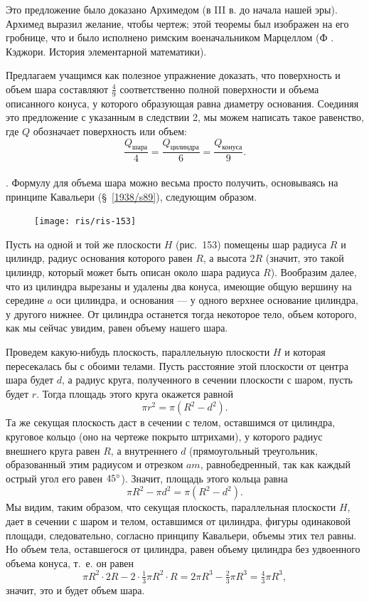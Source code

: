 \documentclass[twoside]{book}
\begin{document}
Это предложение было доказано Архимедом (в III в. до начала нашей эры).
Архимед выразил желание, чтобы чертеж;
этой теоремы был изображен на его гробнице, что и было исполнено римским военачальником Марцеллом (Ф . Кэджори.
История элементарной математики).

Предлагаем учащимся как полезное упражнение доказать, что поверхность и объем шара составляют $\tfrac49$ соответственно полной поверхности и объема описанного конуса, у которого образующая равна диаметру основания.
Соединяя это предложение с указанным в следствии 2, мы можем написать такое равенство, где $Q$ обозначает поверхность или объем:
\[\frac{Q_{\text{шара}}}4
=\frac{Q_{\text{цилиндра}}}6
=\frac{Q_{\text{конуса}}}9.
\]

\paragraph{}\label{1938/s147}
.
Формулу для объема шара можно весьма просто получить, основываясь на принципе Кавальери (§~\ref{1938/s89}), следующим образом.

\begin{figure}[h!]
\centering
\texttt{[image: ris/ris-153]}
\caption{}
\end{figure}

Пусть на одной и той же плоскости $H$ (рис.~153) помещены шар радиуса $R$ и цилиндр, радиус основания которого равен $R$, а высота $2R$ (значит, это такой цилиндр, который может быть описан около шара радиуса $R$).
Вообразим далее, что из цилиндра вырезаны и удалены два конуса, имеющие общую вершину на середине $a$ оси цилиндра, и основания --- у одного верхнее основание цилиндра, у другого нижнее.
От цилиндра останется тогда некоторое тело, объем которого, как мы сейчас увидим, равен объему нашего шара.

Проведем какую-нибудь плоскость, параллельную плоскости $H$ и которая пересекалась бы с обоими телами.
Пусть расстояние этой плоскости от центра шара будет $d$, а радиус круга, полученного в сечении плоскости с шаром, пусть будет $r$.
Тогда площадь этого круга окажется равной 
\[\pi r^2 = \pi (R^2 - d^2).\]
Та же секущая плоскость даст в сечении с телом, оставшимся от цилиндра, круговое кольцо (оно на чертеже покрыто штрихами), у которого радиус внешнего круга равен $R$, а внутреннего $d$ (прямоугольный треугольник, образованный этим радиусом и отрезком $am$, равнобедренный, так как каждый острый угол его равен $45\degree$).
Значит, площадь этого кольца равна 
\[\pi R^2 - \pi d^2 = \pi(R^2 - d^2).\]
Мы видим, таким образом, что секущая плоскость, параллельная плоскости $H$, дает в сечении с шаром и телом, оставшимся от цилиндра, фигуры одинаковой площади, следовательно, согласно принципу Кавальери, объемы этих тел равны.
Но объем тела, оставшегося от цилиндра, равен объему цилиндра без удвоенного объема конуса, т.~е. он равен
\[\pi R^2\cdot 2R - 2 \cdot \tfrac13\pi R^2\cdot R = 2\pi R^3 - \tfrac23\pi R^3 = \tfrac43\pi R^3,\]
значит, это и будет объем шара.
\end{document}
